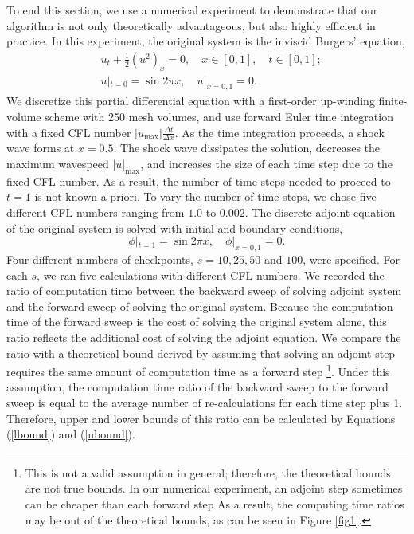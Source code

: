 \documentclass[oneeqnum, onethmnum, onefignum, onetabnum]{siamltex}
\begin{document}
To end this section, we use a numerical experiment to demonstrate that our
algorithm is not only theoretically advantageous, but also highly efficient
in practice.
In this experiment, the original system is the inviscid Burgers' equation,
\[ \begin{aligned}
    & u_t + \frac12 \left(u^2\right)_x = 0, \quad x \in [0, 1],
                                              \quad t \in [0, 1]; \\
    & u|_{t = 0} = \sin 2\pi x, \quad u|_{x = 0,1} = 0.
\end{aligned} \]
We discretize this partial differential equation with a first-order up-winding
finite-volume scheme with 250 mesh volumes, and use forward Euler time
integration with a fixed CFL number $|u_{\max}| \frac{\Delta t}{\Delta x}$.
As the time integration proceeds, a shock wave forms at $x = 0.5$.  The shock
wave dissipates the solution, decreases the maximum wavespeed $|u|_{\max}$,
and increases the size of each time step due to the fixed CFL number.
As a result, the number of time steps needed to proceed to $t = 1$ is not
known a priori.  To vary the number of time steps, we chose five different CFL
numbers ranging from $1.0$ to $0.002$.  The discrete adjoint equation of the
original system is solved with initial and boundary conditions,
\[ \phi|_{t = 1} = \sin 2\pi x, \quad \phi|_{x = 0, 1} = 0. \]
Four different numbers of checkpoints, $s = 10, 25, 50$ and $100$, were
specified.  For each $s$, we ran five calculations with different CFL
numbers.
We recorded the ratio of computation time between the backward sweep
of solving adjoint system and the forward sweep of solving the original system.
Because the computation time of the forward sweep is the cost of solving the
original system alone, this ratio reflects the additional cost of solving
the adjoint equation.  We compare the ratio with a theoretical bound derived
by assuming that solving an
adjoint step requires the same amount of computation time as a forward step
\footnote{This is not a valid assumption in general; therefore, the
theoretical bounds are not true bounds.  In our numerical experiment,
an adjoint step sometimes can be cheaper than each forward step
As a result, the computing time ratios may be out of the theoretical bounds,
as can be seen in Figure \ref{fig1}.}.
Under this assumption, the computation time ratio of the backward sweep to
the forward sweep is equal to the average number of re-calculations for each
time step plus 1.
Therefore, upper and lower bounds of this ratio can be calculated by Equations
(\ref{lbound}) and (\ref{ubound}).
\end{document}
